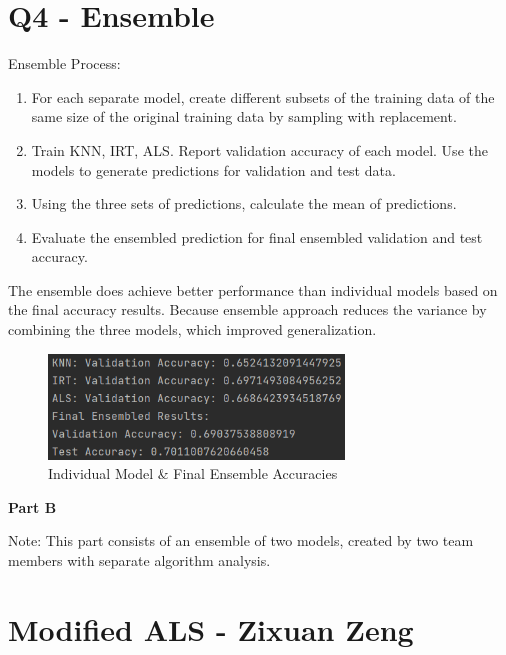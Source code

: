 \documentclass{article}
\begin{document}
\section*{Q4 - Ensemble}
Ensemble Process:
\begin{enumerate}
    \item For each separate model, create different subsets of the training data of the same size of the original training data by sampling with replacement. 
    \item Train KNN, IRT, ALS. Report validation accuracy of each model. Use the models to generate predictions for validation and test data.
    \item Using the three sets of predictions, calculate the mean of predictions.
    \item Evaluate the ensembled prediction for final ensembled validation and test accuracy.
\end{enumerate}
The ensemble does achieve better performance than individual models based on the final accuracy results. Because ensemble approach reduces the variance by combining the three models, which improved generalization.
\begin{figure}[H]
    \centering
    \includegraphics[width=0.7\textwidth]{4.png}
    \caption{Individual Model \& Final Ensemble Accuracies}
\end{figure}
\newpage


\vspace*{5cm}
\begin{center}
\Large\bfseries Part B
\end{center}
Note: This part consists of an ensemble of two models, created by two team members with separate algorithm analysis.
\newpage


\section*{Modified ALS - Zixuan Zeng}
\end{document}
